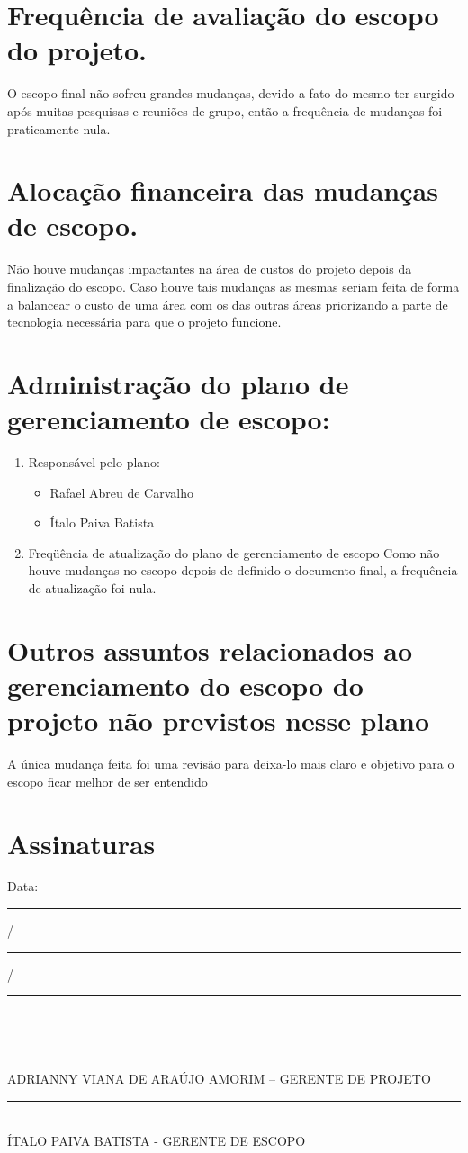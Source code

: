 \section*{Frequência de avaliação do escopo do projeto.}
O escopo final não sofreu grandes mudanças, devido a fato do mesmo ter surgido após muitas pesquisas e reuniões de grupo, então a frequência de mudanças foi praticamente nula.

\section*{Alocação financeira das mudanças de escopo.}
Não houve mudanças impactantes na área de custos do projeto depois da finalização do escopo. Caso houve tais mudanças as mesmas seriam feita de forma a balancear o custo de uma área com os das outras áreas priorizando a parte de tecnologia necessária para que o projeto funcione.

\section*{Administração do plano de gerenciamento de escopo:}
\begin{enumerate}

\item Responsável pelo plano:
\begin{itemize}
\item Rafael Abreu de Carvalho
\item Ítalo Paiva Batista

\end{itemize}

\item Freqüência de atualização do plano de gerenciamento de escopo
Como não houve mudanças no escopo depois de definido o documento final, a frequência de atualização foi nula.
\end{enumerate}

\section*{Outros assuntos relacionados ao gerenciamento do escopo do projeto não previstos nesse plano}
A única mudança feita foi uma revisão para deixa-lo mais claro e objetivo para o escopo ficar melhor de ser entendido

\section*{Assinaturas}
\begin{center}
Data: \rule{0.5cm}{0.1mm}/\rule{0.5cm}{0.1mm}/\rule{1cm}{0.1mm}     \\
\rule{13cm}{0.1mm}\\
ADRIANNY VIANA DE ARAÚJO AMORIM – GERENTE DE PROJETO\\
\rule{13cm}{0.1mm}\\
ÍTALO PAIVA BATISTA - GERENTE DE ESCOPO

\end{center}
% 